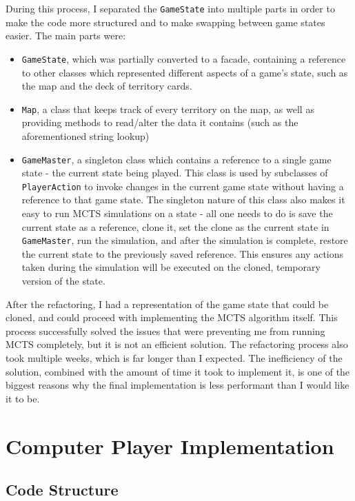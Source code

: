 During this process, I separated the \texttt{GameState} into multiple parts in order to make the code more structured and to make swapping between game states easier. The main parts were:
\begin{itemize}
\item \texttt{GameState}, which was partially converted to a facade, containing a reference to other classes which represented different aspects of a game's state, such as the map and the deck of territory cards.
\item \texttt{Map}, a class that keeps track of every territory on the map, as well as providing methods to read/alter the data it contains (such as the aforementioned string lookup)
\item \texttt{GameMaster}, a singleton class which contains a reference to a single game state - the current state being played. This class is used by subclasses of \texttt{PlayerAction} to invoke changes in the current game state without having a reference to that game state. The singleton nature of this class also makes it easy to run MCTS simulations on a state - all one needs to do is save the current state as a reference, clone it, set the clone as the current state in \texttt{GameMaster}, run the simulation, and after the simulation is complete, restore the current state to the previously saved reference. This ensures any actions taken during the simulation will be executed on the cloned, temporary version of the state.
\end{itemize}

After the refactoring, I had a representation of the game state that could be cloned, and could proceed with implementing the MCTS algorithm itself. This process successfully solved the issues that were preventing me from running MCTS completely, but it is not an efficient solution. The refactoring process also took multiple weeks, which is far longer than I expected. The inefficiency of the solution, combined with the amount of time it took to implement it, is one of the biggest reasons why the final implementation is less performant than I would like it to be.

\section{Computer Player Implementation}
\label{computerPlayerImplementation}
\subsection{Code Structure}
\label{computerPlayerCodeStructure}

